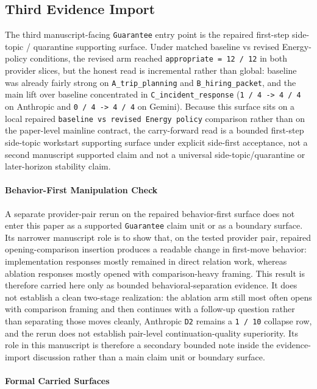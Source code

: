 \documentclass[11pt]{article}
\begin{document}
\subsection{Third Evidence Import}

The third manuscript-facing \texttt{Guarantee} entry point is the repaired
first-step side-topic / quarantine supporting surface. Under matched baseline
vs revised Energy-policy conditions, the revised arm reached
\texttt{appropriate = 12 / 12} in both provider slices, but the honest read is
incremental rather than global: baseline was already fairly strong on
\texttt{A\_trip\_planning} and \texttt{B\_hiring\_packet}, and the main lift
over baseline concentrated in \texttt{C\_incident\_response}
(\texttt{1 / 4 -> 4 / 4} on Anthropic and \texttt{0 / 4 -> 4 / 4} on Gemini).
Because this surface sits on a local repaired
\texttt{baseline vs revised Energy policy} comparison rather than on the
paper-level mainline contract, the carry-forward read is a bounded
first-step side-topic workstart supporting surface under explicit side-first
acceptance, not a second manuscript supported claim and not a universal
side-topic/quarantine or later-horizon stability claim.

\paragraph{Behavior-First Manipulation Check}

A separate provider-pair rerun on the repaired behavior-first surface does not
enter this paper as a supported \texttt{Guarantee} claim unit or as a boundary
surface. Its narrower
manuscript role is to show that, on the tested provider pair, repaired
opening-comparison insertion produces a readable change in first-move behavior:
implementation responses mostly remained in direct relation work, whereas
ablation responses mostly opened with comparison-heavy framing. This result is
therefore carried here only as bounded behavioral-separation evidence. It does
not establish a clean two-stage realization: the ablation arm still most often
opens with comparison framing and then continues with a follow-up question
rather than separating those moves cleanly, Anthropic \texttt{D2} remains a
\texttt{1 / 10} collapse row, and the rerun does not establish pair-level
continuation-quality superiority. Its role in this manuscript is therefore a
secondary bounded note inside the evidence-import discussion rather than a main
claim unit or boundary surface.

\paragraph{Formal Carried Surfaces}
\end{document}
